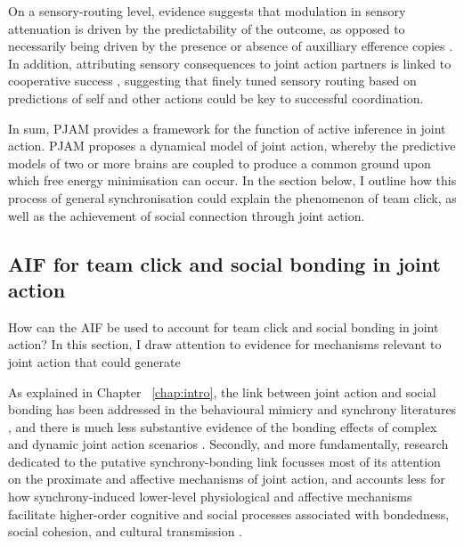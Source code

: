 \begin{CJK}{UTF8}{gbsn}
On a sensory-routing level, evidence suggests that modulation in sensory attenuation is driven by the predictability of the outcome, as opposed to necessarily being driven by the presence or absence of auxilliary efference copies \citep{Sato2008}.  In addition, attributing sensory consequences to joint action partners is linked to cooperative success \citep{Chaminade2012}, suggesting that finely tuned sensory routing based on predictions of self and other actions could be key to successful coordination.

In sum, PJAM provides a framework for the function of active inference in joint action.  PJAM proposes a dynamical model of joint action, whereby the predictive models of two or more brains are coupled to produce a common ground upon which free energy minimisation can occur.  In the section below, I outline how this process of general synchronisation could explain the phenomenon of team click, as well as the achievement of social connection through joint action.



\subsection{AIF for team click and social bonding in joint action\label{}}

How can the AIF be used to account for team click and social bonding in joint action? In this section, I draw attention to evidence for mechanisms relevant to joint action that could generate

As explained in Chapter ~\ref{chap:intro}, the link between joint action and social bonding has been addressed in the behavioural mimicry and synchrony literatures \citep[see Chapter ~\ref{chap:intro} Section ~\ref{sect:synchrony}.
There is now strong evidence to suggest that a combination of 1) neuropharmacological reward arising from lower-cognitive affective mechanisms, 2) self-other merging resulting from neurocognitive alignment \citep{Rizzolatti2010}, and 3) reinforcement of cooperative relationships owing to experience of interpersonal association in joint action \citep{Reddish2013} generates a psychophysiological environment conducive to generating social bonds.  Yet, almost all of these studies operationalise joint action as exact in-phase behavioural synchrony \citep[see][]{Mogan2017}, and there is much less substantive evidence of the bonding effects of complex and dynamic joint action scenarios \citep[but see][]{Marsh2009,Miles2009,Lumsden2012}.  Secondly, and more fundamentally, research dedicated to the putative synchrony-bonding link focusses most of its attention on the proximate and affective mechanisms of joint action, and accounts less for how synchrony-induced lower-level physiological and affective mechanisms facilitate higher-order cognitive and social processes associated with bondedness, social cohesion, and cultural transmission \citep{Heyes2012}.


\end{CJK}

